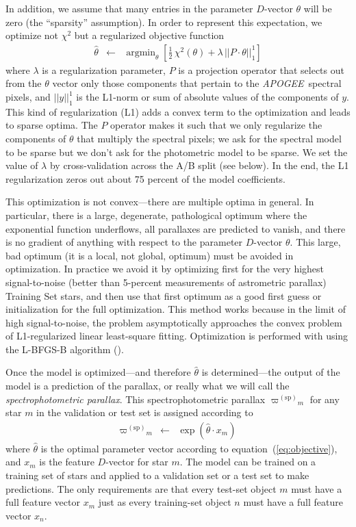 \documentclass[modern]{aastex62}
\newcommand{\equationname}{equation}
\newcommand{\code}[1]{\texttt{\detokenize{#1}}}
\newcommand{\acronym}[1]{{\small{#1}}}
\newcommand{\project}[1]{\textsl{#1}}
\newcommand{\apogee}{\project{\acronym{APOGEE}}}
\DeclareMathOperator*{\argmin}{argmin}
\newcommand{\sparallax}{{\varpi^{(\mathrm{sp})}}}
\begin{document}
In addition, we assume that many entries in the parameter $D$-vector $\theta$ will be zero
(the ``sparsity'' assumption).
In order to represent this expectation,
we optimize not $\chi^2$ but a regularized objective function
\begin{eqnarray}
\hat{\theta} &\leftarrow& \argmin_{\theta}\left[\frac{1}{2}\,\chi^2(\theta) + \lambda\,||P\cdot\theta||_1^1\right]
\label{eq:objective}
\end{eqnarray}
where
$\lambda$ is a regularization parameter,
$P$ is a projection operator that selects out from the $\theta$ vector only those components
that pertain to the \apogee\ spectral pixels,
and $||y||_1^1$ is the L1-norm or sum of absolute values of the components of $y$.
This kind of regularization (L1) adds a convex term to the optimization and leads to
sparse optima.
The $P$ operator makes it such that we only regularize the components of $\theta$ that multiply
the spectral pixels; we ask for the spectral model to be sparse but we don't ask for the photometric
model to be sparse.
We set the value of $\lambda$ by cross-validation across the A/B split (see below).
In the end, the L1 regularization zeros out about 75 percent of the model coefficients.

This optimization is not convex---there are multiple optima in general.
In particular, there is a large, degenerate, pathological optimum where
the exponential function underflows, all parallaxes are predicted to vanish,
and there is no gradient of anything with respect to the parameter $D$-vector $\theta$.
This large, bad optimum (it is a local, not global, optimum) must be avoided in optimization.
In practice we avoid it by optimizing first for the very highest signal-to-noise
(better than 5-percent measurements of astrometric parallax)
Training Set stars, and then use that first optimum as a
good first guess or initialization for the full optimization.
This method works because in the limit of high signal-to-noise, the problem asymptotically approaches
the convex problem of L1-regularized linear least-square fitting.
Optimization is performed with \code{scipy.optimize} using the
\acronym{L-BFGS-B} algorithm (\citealt{lbfgsb}).

Once the model is optimized---and therefore $\hat{\theta}$ is determined---the
output of the model is a prediction of the parallax,
or really what we will call the \emph{spectrophotometric parallax}.
This spectrophotometric parallax
$\sparallax_m$ for any star $m$ in the validation or test set is
assigned according to
\begin{eqnarray}
\sparallax_m &\leftarrow& \exp(\hat{\theta}\cdot x_m)
\end{eqnarray}
where
$\hat{\theta}$ is the optimal parameter vector according
to \equationname~(\ref{eq:objective}),
and
$x_m$ is the feature $D$-vector for star $m$.
The model can be trained on a training set of stars and applied to
a validation set or a test set to make predictions.
The only requirements are that every test-set object $m$  must have a full feature
vector $x_m$ just as every training-set object $n$ must have a full feature
vector $x_n$.
\end{document}
